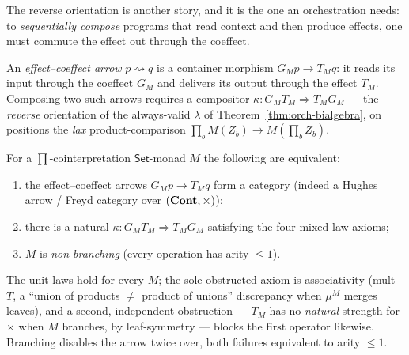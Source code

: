 The reverse orientation is another story, and it is the one an orchestration needs: to
\emph{sequentially compose} programs that read context and then produce effects, one must commute the
effect out through the coeffect.

\begin{definition}\label{def:orch-arrow}
An \emph{effect--coeffect arrow} $p\rightsquigarrow q$ is a container morphism $G_M p\to T_M q$: it
reads its input through the coeffect $G_M$ and delivers its output through the effect $T_M$. Composing
two such arrows requires a compositor $\kappa:G_M T_M\Rightarrow T_M G_M$ --- the \emph{reverse}
orientation of the always-valid $\lambda$ of Theorem~\ref{thm:orch-bialgebra}, on positions the
\emph{lax} product-comparison $\prod_b M(Z_b)\to M(\prod_b Z_b)$.
\end{definition}

\begin{theorem}\label{thm:orch-arrow}
For a $\prod$-cointerpretation $\mathsf{Set}$-monad $M$ the following are equivalent:
\begin{enumerate}
\item the effect--coeffect arrows $G_M p\to T_M q$ form a category (indeed a Hughes arrow / Freyd
category over $(\mathbf{Cont},\times)$);
\item there is a natural $\kappa:G_M T_M\Rightarrow T_M G_M$ satisfying the four mixed-law axioms;
\item $M$ is \emph{non-branching} (every operation has arity $\le1$).
\end{enumerate}
The unit laws hold for every $M$; the sole obstructed axiom is associativity (mult-$T$, a
``union of products $\ne$ product of unions'' discrepancy when $\mu^M$ merges leaves), and a second,
independent obstruction --- $T_M$ has no \emph{natural} strength for $\times$ when $M$ branches, by
leaf-symmetry --- blocks the $\mathrm{first}$ operator likewise. Branching disables the arrow twice
over, both failures equivalent to arity $\le1$.
\end{theorem}

